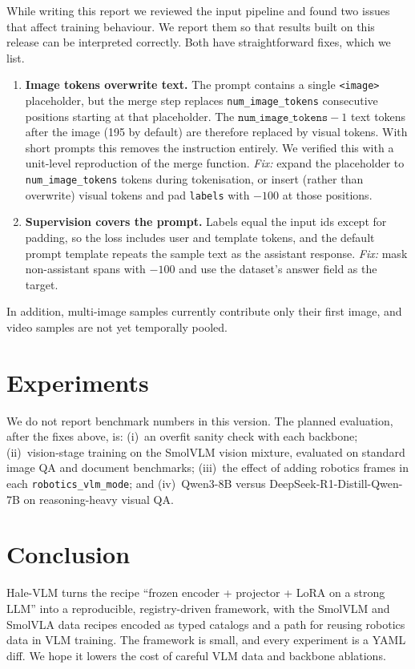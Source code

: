 \documentclass[11pt]{article}
\newcommand{\tok}[1]{\texttt{<#1>}}
\begin{document}
While writing this report we reviewed the input pipeline and found two issues that affect
training behaviour. We report them so that results built on this release can be
interpreted correctly. Both have straightforward fixes, which we list.
\begin{enumerate}
  \item \textbf{Image tokens overwrite text.} The prompt contains a single \tok{image}
        placeholder, but the merge step replaces \texttt{num\_image\_tokens} consecutive
        positions starting at that placeholder. The $\texttt{num\_image\_tokens}-1$ text
        tokens after the image (195 by default) are therefore replaced by visual tokens.
        With short prompts this removes the instruction entirely. We verified this with a
        unit-level reproduction of the merge function. \emph{Fix:} expand the placeholder
        to \texttt{num\_image\_tokens} tokens during tokenisation, or insert (rather than
        overwrite) visual tokens and pad \texttt{labels} with $-100$ at those positions.
  \item \textbf{Supervision covers the prompt.} Labels equal the input ids except for
        padding, so the loss includes user and template tokens, and the default prompt
        template repeats the sample text as the assistant response. \emph{Fix:} mask
        non-assistant spans with $-100$ and use the dataset's answer field as the target.
\end{enumerate}
In addition, multi-image samples currently contribute only their first image, and video
samples are not yet temporally pooled.

\section{Experiments}

We do not report benchmark numbers in this version. The planned evaluation, after the
fixes above, is: (i)~an overfit sanity check with each backbone; (ii)~vision-stage training
on the SmolVLM vision mixture, evaluated on standard image QA and document benchmarks;
(iii)~the effect of adding robotics frames in each \texttt{robotics\_vlm\_mode}; and
(iv)~Qwen3-8B versus DeepSeek-R1-Distill-Qwen-7B on reasoning-heavy visual QA.

\section{Conclusion}

Hale-VLM turns the recipe ``frozen encoder + projector + LoRA on a strong LLM'' into a
reproducible, registry-driven framework, with the SmolVLM and SmolVLA data recipes encoded
as typed catalogs and a path for reusing robotics data in VLM training. The framework is
small, and every experiment is a YAML diff. We hope it lowers the cost of careful VLM
data and backbone ablations.



\end{document}
